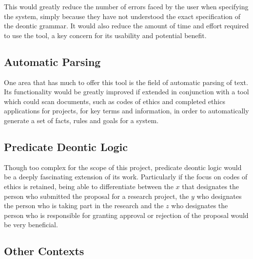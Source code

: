 \documentclass{l4proj}
\begin{document}
This would greatly reduce the number of errors faced by the user when specifying the system, simply because they have not understood the exact specification of the deontic grammar. It would also reduce the amount of time and effort required to use the tool, a key concern for its usability and potential benefit. 

\subsection{Automatic Parsing}
One area that has much to offer this tool is the field of automatic parsing of text. Its functionality would be greatly improved if extended in conjunction with a tool which could scan documents, such as codes of ethics and completed ethics applications for projects, for key terms and information, in order to automatically generate a set of facts, rules and goals for a system. 

\subsection{Predicate Deontic Logic}
Though too complex for the scope of this project, predicate deontic logic would be a deeply fascinating extension of its work. Particularly if the focus on codes of ethics is retained, being able to differentiate between the $x$ that designates the person who submitted the proposal for a research project, the $y$ who designates the person who is taking part in the research and the $z$ who designates the person who is responsible for granting approval or rejection of the proposal would be very beneficial. 

\subsection{Other Contexts}
\end{document}
